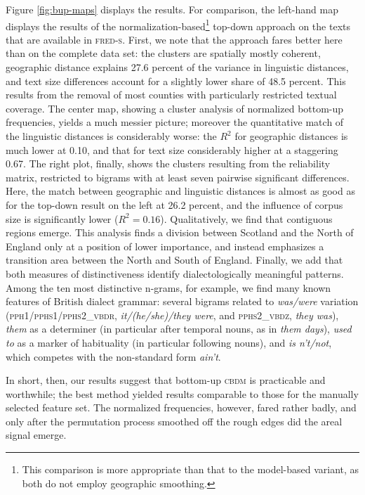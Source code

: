 \documentclass[output=paper]{LSP/langsci}
\begin{document}
Figure \ref{fig:bup-maps} displays the results.
For comparison, the left-hand map displays the results of the normalization-based\footnote{This comparison is more appropriate than that to the model-based variant, as both do not employ geographic smoothing.} top-down approach on the texts that are available in \textsc{fred-s}.
First, we note that the approach fares better here than on the complete data set: the clusters are spatially mostly coherent, geographic distance explains 27.6 percent of the variance in linguistic distances, and text size differences account for a slightly lower share of 48.5 percent. 
This results from the removal of most counties with particularly restricted textual coverage.
The center map, showing a cluster analysis of normalized bottom-up frequencies, yields a much messier picture; moreover the quantitative match of the linguistic distances is considerably worse: the $R^2$ for geographic distances is much lower at 0.10, and that for text size considerably higher at a staggering 0.67.
The right plot, finally, shows the clusters resulting from the reliability matrix, restricted to bigrams with at least seven pairwise significant differences.
Here, the match between geographic and linguistic distances is almost as good as for the top-down result on the left at 26.2 percent, and the influence of corpus size is significantly lower ($R^2 = 0.16$).
Qualitatively, we find that contiguous regions emerge. 
This analysis finds a division between Scotland and the North of England only at a position of lower importance, and instead emphasizes a transition area between the North and South of England.
Finally, we add that both measures of distinctiveness identify dialectologically meaningful patterns.
Among the ten most distinctive n-grams, for example, we find many known features of British dialect grammar: several bigrams related to \emph{was/were} variation (\textsc{pph1/pphs1/pphs2\_vbdr}, \emph{it/(he/she)/they were}, and \textsc{pphs2\_vbdz}, \emph{they was}), \emph{them} as a determiner (in particular after temporal nouns, as in \emph{them days}), \emph{used to} as a marker of habituality (in particular following nouns), and \emph{is n't/not}, which competes with the non-standard form \emph{ain't}.

In short, then, our results suggest that bottom-up \textsc{cbdm} is practicable and worthwhile; the best method yielded results comparable to those for the manually selected feature set. 
The normalized frequencies, however, fared rather badly, and only after the permutation process smoothed off the rough edges did the areal signal emerge.
\end{document}
